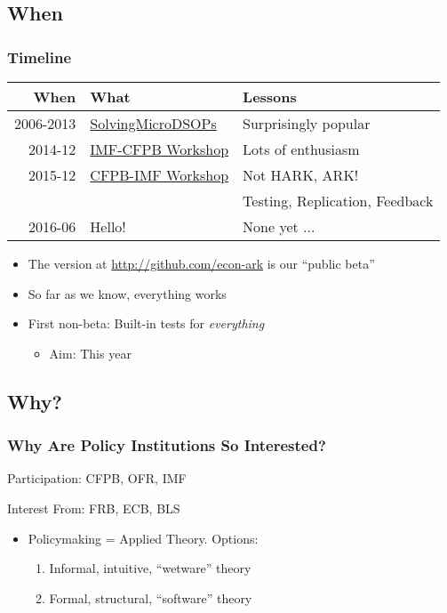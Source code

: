 \documentclass[public]{beamer}
\begin{document}
\subsection{When}

\begin{frame}
\frametitle{Timeline}

\begin{center}
\begin{tabular}{rll}
When & What & Lessons
\\ \hline 2006-2013 & \href{http://econ.jhu.edu/people/ccarroll/SolvingMicroDSOPs}{SolvingMicroDSOPs} & Surprisingly popular
\\ 2014-12 & \href{}{IMF-CFPB Workshop} & Lots of enthusiasm
\\ 2015-12 & \href{}{CFPB-IMF Workshop} & Not HARK, ARK!  
\\ & & Testing, Replication, Feedback
\\ 2016-06 & Hello! & None yet ...
\end{tabular}
\end{center}

\begin{itemize}
\item The version at \href{github.com/econ-ark}{http://github.com/econ-ark}  is our ``public beta''
\item So far as we know, everything works
\item First non-beta: Built-in tests for {\it everything}
\begin{itemize}
\item Aim: This year
\end{itemize}
\end{itemize}

\end{frame}

\subsection{Why?}
\begin{frame}
\frametitle{Why Are Policy Institutions So Interested?}

Participation: CFPB, OFR, IMF 

Interest From: FRB, ECB, BLS

\begin{itemize}
\item Policymaking = Applied Theory.  Options:
\begin{enumerate}
\item Informal, intuitive, ``wetware'' theory 
\item Formal, structural, ``software'' theory 
\end{enumerate}
\end{itemize}

\end{frame}
\end{document}
